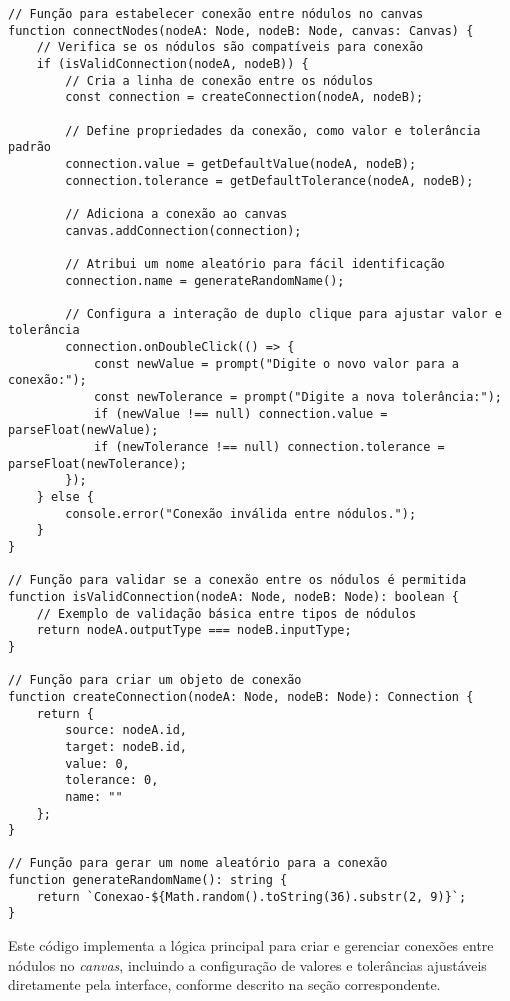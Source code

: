 \begin{verbatim}
// Função para estabelecer conexão entre nódulos no canvas
function connectNodes(nodeA: Node, nodeB: Node, canvas: Canvas) {
    // Verifica se os nódulos são compatíveis para conexão
    if (isValidConnection(nodeA, nodeB)) {
        // Cria a linha de conexão entre os nódulos
        const connection = createConnection(nodeA, nodeB);

        // Define propriedades da conexão, como valor e tolerância padrão
        connection.value = getDefaultValue(nodeA, nodeB);
        connection.tolerance = getDefaultTolerance(nodeA, nodeB);

        // Adiciona a conexão ao canvas
        canvas.addConnection(connection);

        // Atribui um nome aleatório para fácil identificação
        connection.name = generateRandomName();

        // Configura a interação de duplo clique para ajustar valor e tolerância
        connection.onDoubleClick(() => {
            const newValue = prompt("Digite o novo valor para a conexão:");
            const newTolerance = prompt("Digite a nova tolerância:");
            if (newValue !== null) connection.value = parseFloat(newValue);
            if (newTolerance !== null) connection.tolerance = parseFloat(newTolerance);
        });
    } else {
        console.error("Conexão inválida entre nódulos.");
    }
}

// Função para validar se a conexão entre os nódulos é permitida
function isValidConnection(nodeA: Node, nodeB: Node): boolean {
    // Exemplo de validação básica entre tipos de nódulos
    return nodeA.outputType === nodeB.inputType;
}

// Função para criar um objeto de conexão
function createConnection(nodeA: Node, nodeB: Node): Connection {
    return {
        source: nodeA.id,
        target: nodeB.id,
        value: 0,
        tolerance: 0,
        name: ""
    };
}

// Função para gerar um nome aleatório para a conexão
function generateRandomName(): string {
    return `Conexao-${Math.random().toString(36).substr(2, 9)}`;
}
\end{verbatim}

Este código implementa a lógica principal para criar e gerenciar conexões entre nódulos no \textit{canvas}, incluindo a configuração de valores e tolerâncias ajustáveis diretamente pela interface, conforme descrito na seção correspondente.

